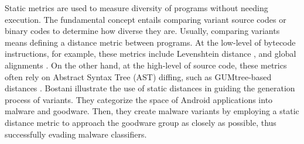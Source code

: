 \begin{strategy}
    \label{static_based}
    Static metrics are used to measure diversity of programs without needing execution. 
    The fundamental concept entails comparing variant source codes or binary codes to determine how diverse they are. 
    Usually, comparing variants means defining a distance metric between programs. 
    At the low-level of bytecode instructions, for example, these metrics include Levenshtein distance \cite{DBLP:journals/corr/abs-2111-09934}, and global alignments \cite{CROW}. 
    On the other hand, at the high-level of source code, these metrics often rely on Abstract Syntax Tree (AST) diffing, such as GUMtree-based distances \cite{gumtree}. 
    Bostani \etal \cite{Bostani2021EvadeDroidAP} illustrate the use of static distances in guiding the generation process of variants. 
    They categorize the space of Android applications into malware and goodware. 
    Then, they create malware variants by employing a static distance metric to approach the goodware group as closely as possible, thus successfully evading malware classifiers.
\end{strategy}

